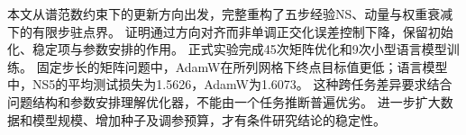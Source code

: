 本文从谱范数约束下的更新方向出发，完整重构了五步经验NS、动量与权重衰减下的有限步驻点界。
证明通过方向对齐而非单调正交化误差控制下降，保留初始化、稳定项与参数安排的作用。
正式实验完成45次矩阵优化和9次小型语言模型训练。
固定步长的矩阵问题中，AdamW在所列网格下终点目标值更低；语言模型中，NS5的平均测试损失为1.5626，AdamW为1.6073。
这种跨任务差异要求结合问题结构和参数安排理解优化器，不能由一个任务推断普遍优劣。
进一步扩大数据和模型规模、增加种子及调参预算，才有条件研究结论的稳定性。
